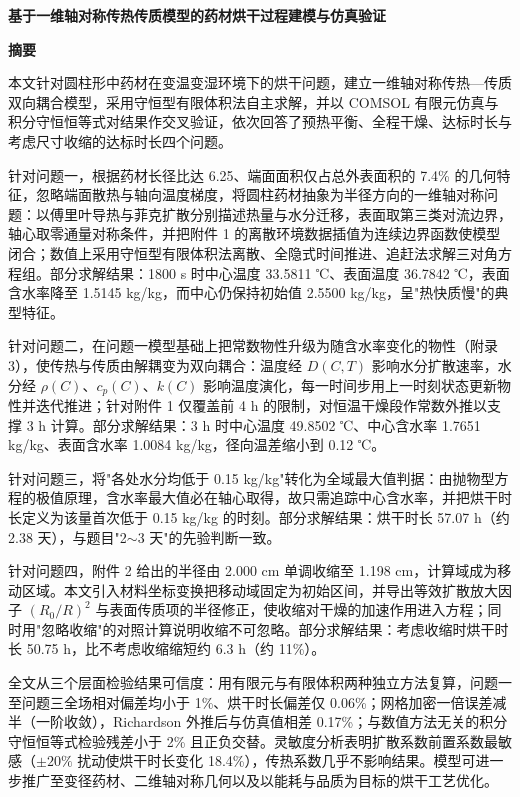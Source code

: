 \documentclass[12pt,a4paper]{article}
\begin{document}
\linespread{1.02}\selectfont


\setcounter{page}{1}

\begin{center}
{\bfseries 基于一维轴对称传热传质模型的药材烘干过程建模与仿真验证}

\vspace{2ex}
{\bfseries 摘\quad 要}
\end{center}

本文针对圆柱形中药材在变温变湿环境下的烘干问题，建立一维轴对称传热—传质双向耦合模型，采用守恒型有限体积法自主求解，并以 COMSOL 有限元仿真与积分守恒恒等式对结果作交叉验证，依次回答了预热平衡、全程干燥、达标时长与考虑尺寸收缩的达标时长四个问题。

针对问题一，根据药材长径比达 6.25、端面面积仅占总外表面积的 7.4\% 的几何特征，忽略端面散热与轴向温度梯度，将圆柱药材抽象为半径方向的一维轴对称问题：以傅里叶导热与菲克扩散分别描述热量与水分迁移，表面取第三类对流边界，轴心取零通量对称条件，并把附件 1 的离散环境数据插值为连续边界函数使模型闭合；数值上采用守恒型有限体积法离散、全隐式时间推进、追赶法求解三对角方程组。部分求解结果：1800 s 时中心温度 33.5811 ℃、表面温度 36.7842 ℃，表面含水率降至 1.5145 kg/kg，而中心仍保持初始值 2.5500 kg/kg，呈"热快质慢"的典型特征。

针对问题二，在问题一模型基础上把常数物性升级为随含水率变化的物性（附录 3），使传热与传质由解耦变为双向耦合：温度经 $D(C,T)$ 影响水分扩散速率，水分经 $\rho(C)$、$c_p(C)$、$k(C)$ 影响温度演化，每一时间步用上一时刻状态更新物性并迭代推进；针对附件 1 仅覆盖前 4 h 的限制，对恒温干燥段作常数外推以支撑 3 h 计算。部分求解结果：3 h 时中心温度 49.8502 ℃、中心含水率 1.7651 kg/kg、表面含水率 1.0084 kg/kg，径向温差缩小到 0.12 ℃。

针对问题三，将"各处水分均低于 0.15 kg/kg"转化为全域最大值判据：由抛物型方程的极值原理，含水率最大值必在轴心取得，故只需追踪中心含水率，并把烘干时长定义为该量首次低于 0.15 kg/kg 的时刻。部分求解结果：烘干时长 57.07 h（约 2.38 天），与题目"2$\sim$3 天"的先验判断一致。

针对问题四，附件 2 给出的半径由 2.000 cm 单调收缩至 1.198 cm，计算域成为移动区域。本文引入材料坐标变换把移动域固定为初始区间，并导出等效扩散放大因子 $(R_0/R)^2$ 与表面传质项的半径修正，使收缩对干燥的加速作用进入方程；同时用"忽略收缩"的对照计算说明收缩不可忽略。部分求解结果：考虑收缩时烘干时长 50.75 h，比不考虑收缩缩短约 6.3 h（约 11\%）。

全文从三个层面检验结果可信度：用有限元与有限体积两种独立方法复算，问题一至问题三全场相对偏差均小于 1\%、烘干时长偏差仅 0.06\%；网格加密一倍误差减半（一阶收敛），Richardson 外推后与仿真值相差 0.17\%；与数值方法无关的积分守恒恒等式检验残差小于 2\% 且正负交替。灵敏度分析表明扩散系数前置系数最敏感（$\pm20\%$ 扰动使烘干时长变化 18.4\%），传热系数几乎不影响结果。模型可进一步推广至变径药材、二维轴对称几何以及以能耗与品质为目标的烘干工艺优化。
\end{document}
